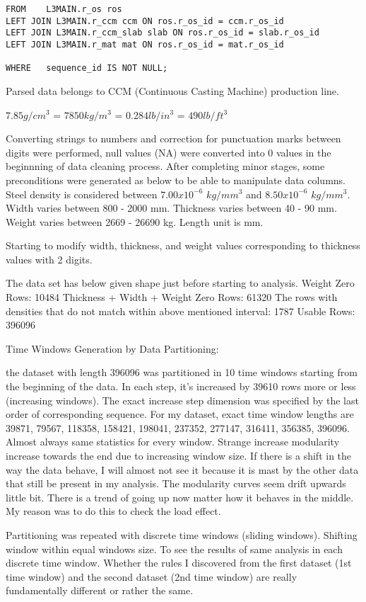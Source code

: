 {\begin{lstlisting}
FROM   	L3MAIN.r_os ros 
LEFT JOIN L3MAIN.r_ccm ccm ON ros.r_os_id = ccm.r_os_id 
LEFT JOIN L3MAIN.r_ccm_slab slab ON ros.r_os_id = slab.r_os_id 
LEFT JOIN L3MAIN.r_mat mat ON ros.r_os_id = mat.r_os_id 
	
WHERE  	sequence_id IS NOT NULL;
\end{lstlisting}

Parsed data belongs to CCM (Continuous Casting Machine) production line.

$7.85 g/cm^{3}$ = $7850 kg/m^{3}$ = $0.284 lb/in^{3}$ = $490 lb/ft^{3}$

Converting strings to numbers and correction for punctuation marks between digits were performed, null values (NA) were converted into $0$ values in the beginnning of data cleaning process. After completing minor stages, some preconditions were generated as below to be able to manipulate data columns.
Steel density is considered between $7.00 x 10^{-6}$ $kg/mm^{3}$ and $8.50x10^{-6}$ $kg/mm^{3}$.
Width varies between 800 - 2000 mm. 
Thickness varies between 40 - 90 mm. 
Weight varies between 2669 - 26690 kg.
Length unit is mm.

Starting to modify width, thickness, and weight values corresponding to thickness values with 2 digits.

The data set has below given shape just before starting to analysis.
Weight Zero Rows: 10484
Thickness + Width + Weight Zero Rows: 61320
The rows with densities that do not match within above mentioned interval: 1787
Usable Rows: 396096

Time Windows Generation by Data Partitioning:

the dataset with length 396096 was partitioned in 10 time windows starting from the beginning of the data. In each step, it's increased by 39610 rows more or less (increasing windows). The exact increase step dimension was specified by the last order of corresponding sequence. For my dataset, exact time window lengths are 39871, 79567, 118358, 158421, 198041, 237352, 277147, 316411, 356385, 396096. Almost always same statistics for every window. Strange increase modularity increase towards the end due to increasing window size. If there is a shift in the way the data behave, I will almost not see it because it is mast by the other data that still be present in my analysis. The modularity curves seem drift upwards little bit. There is a trend of going up now matter how it behaves in the middle. My reason was to do this to check the load effect.

Partitioning was repeated with discrete time windows (sliding windows). Shifting window within equal windows size. To see the results of same analysis in each discrete time window. Whether the rules I discovered from the first dataset (1st time window) and the second dataset (2nd time window) are really fundamentally different or rather the same.

}
